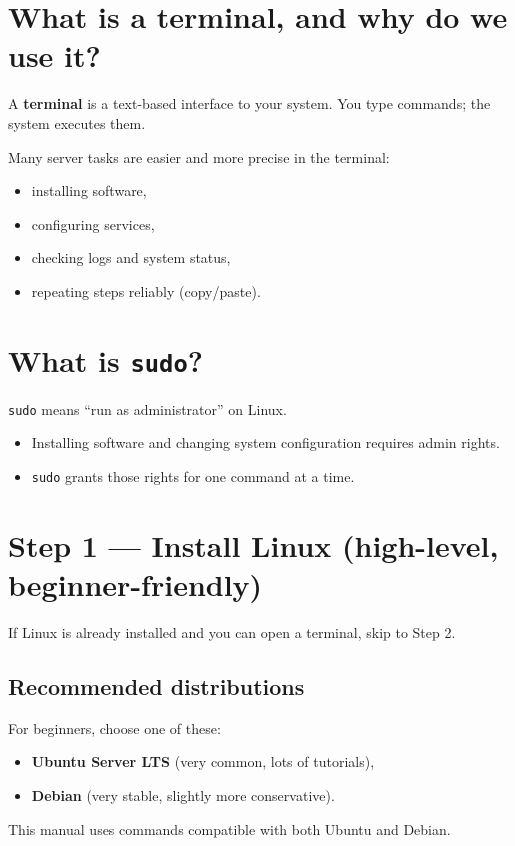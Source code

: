\section{What is a terminal, and why do we use it?}
A \textbf{terminal} is a text-based interface to your system. You type commands; the system executes them.

Many server tasks are easier and more precise in the terminal:
\begin{itemize}[leftmargin=*]
  \item installing software,
  \item configuring services,
  \item checking logs and system status,
  \item repeating steps reliably (copy/paste).
\end{itemize}

\section{What is \texttt{sudo}?}
\texttt{sudo} means ``run as administrator'' on Linux.
\begin{itemize}[leftmargin=*]
  \item Installing software and changing system configuration requires admin rights.
  \item \texttt{sudo} grants those rights for one command at a time.
\end{itemize}

\section{Step 1 --- Install Linux (high-level, beginner-friendly)}
If Linux is already installed and you can open a terminal, skip to Step 2.

\subsection{Recommended distributions}
For beginners, choose one of these:
\begin{itemize}[leftmargin=*]
  \item \textbf{Ubuntu Server LTS} (very common, lots of tutorials),
  \item \textbf{Debian} (very stable, slightly more conservative).
\end{itemize}

This manual uses commands compatible with both Ubuntu and Debian.

